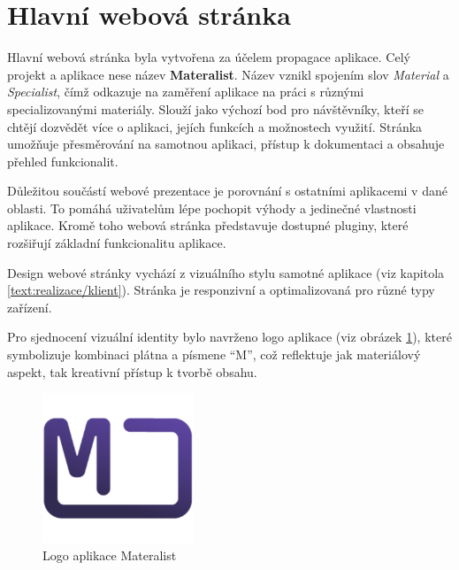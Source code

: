 
\section{Hlavní webová stránka}

 Hlavní webová stránka byla vytvořena za účelem propagace aplikace.
 Celý projekt a aplikace nese název \textbf{Materalist}.
 Název vznikl spojením slov \textit{Material} a \textit{Specialist}, čímž odkazuje na zaměření aplikace na práci s různými specializovanými materiály.
 Slouží jako výchozí bod pro návštěvníky, kteří se chtějí dozvědět více o aplikaci, jejích funkcích a možnostech využití. 
 Stránka umožňuje přesměrování na samotnou aplikaci, přístup k dokumentaci a obsahuje přehled funkcionalit.

Důležitou součástí webové prezentace je porovnání s ostatními aplikacemi v dané oblasti. 
To pomáhá uživatelům lépe pochopit výhody a jedinečné vlastnosti aplikace. 
Kromě toho webová stránka představuje dostupné pluginy, které rozšiřují základní funkcionalitu aplikace.

Design webové stránky vychází z vizuálního stylu samotné aplikace (viz kapitola \ref{text:realizace/klient}). 
Stránka je responzivní a optimalizovaná pro různé typy zařízení.

Pro sjednocení vizuální identity bylo navrženo logo aplikace (viz obrázek \ref{fig:logo}), které symbolizuje kombinaci plátna a písmene \enquote{M}, což reflektuje jak materiálový aspekt, tak kreativní přístup k tvorbě obsahu.

\begin{figure}[ht!]
    \centering
    \includegraphics[width=0.4\textwidth]{media/05_realizace/logo.png}
    \caption{Logo aplikace Materalist}
    \label{fig:logo}
\end{figure}


